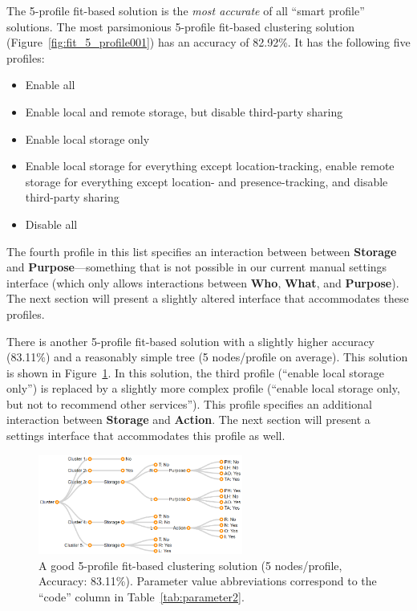 The 5-profile fit-based solution is the \emph{most accurate} of all ``smart profile'' solutions. The most parsimonious 5-profile fit-based clustering solution (Figure~\ref{fig:fit_5_profile001}) has an accuracy of 82.92\%. It has the following five profiles:
\begin{itemize}
	\item Enable all
	\item Enable local and remote storage, but disable third-party sharing
	\item Enable local storage only
	\item Enable local storage for everything except location-tracking, enable remote storage for everything except location- and presence-tracking, and disable third-party sharing
	\item Disable all
\end{itemize}
The fourth profile in this list specifies an interaction between between \textbf{Storage} and \textbf{Purpose}---something that is not possible in our current manual settings interface (which only allows interactions between \textbf{Who}, \textbf{What}, and \textbf{Purpose}). The next section will present a slightly altered interface that accommodates these profiles.

There is another 5-profile fit-based solution with a slightly higher accuracy (83.11\%) and a reasonably simple tree (5 nodes/profile on average). This solution is shown in Figure~\ref{fig:fit_5_profile003}. In this solution, the third profile (``enable local storage only'') is replaced by a slightly more complex profile (``enable local storage only, but not to recommend other services''). This profile specifies an additional interaction between \textbf{Storage} and \textbf{Action}. The next section will present a settings interface that accommodates this profile as well.

\begin{figure}
	\centering
	\includegraphics[width=0.6\textwidth]{figures/fit_5_profile003.png}
	\caption{A good 5-profile fit-based clustering solution (5 nodes/profile, Accuracy: 83.11\%). Parameter value abbreviations correspond to the ``code'' column in Table~\ref{tab:parameter2}.}
	\label{fig:fit_5_profile003}
\end{figure}

